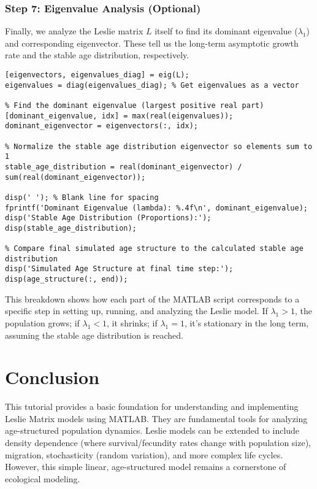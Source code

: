 \documentclass{article}
\begin{document}
\subsubsection{Step 7: Eigenvalue Analysis (Optional)}
Finally, we analyze the Leslie matrix $L$ itself to find its dominant eigenvalue ($\lambda_1$) and corresponding eigenvector. These tell us the long-term asymptotic growth rate and the stable age distribution, respectively.
\begin{lstlisting}[caption={Eigenvalue analysis of the Leslie Matrix}]
[eigenvectors, eigenvalues_diag] = eig(L);
eigenvalues = diag(eigenvalues_diag); % Get eigenvalues as a vector

% Find the dominant eigenvalue (largest positive real part)
[dominant_eigenvalue, idx] = max(real(eigenvalues));
dominant_eigenvector = eigenvectors(:, idx);

% Normalize the stable age distribution eigenvector so elements sum to 1
stable_age_distribution = real(dominant_eigenvector) / sum(real(dominant_eigenvector));

disp(' '); % Blank line for spacing
fprintf('Dominant Eigenvalue (lambda): %.4f\n', dominant_eigenvalue);
disp('Stable Age Distribution (Proportions):');
disp(stable_age_distribution);

% Compare final simulated age structure to the calculated stable age distribution
disp('Simulated Age Structure at final time step:');
disp(age_structure(:, end));
\end{lstlisting}

This breakdown shows how each part of the MATLAB script corresponds to a specific step in setting up, running, and analyzing the Leslie model. If $\lambda_1 > 1$, the population grows; if $\lambda_1 < 1$, it shrinks; if $\lambda_1 = 1$, it's stationary in the long term, assuming the stable age distribution is reached.

\section{Conclusion}

This tutorial provides a basic foundation for understanding and implementing Leslie Matrix models using MATLAB. They are fundamental tools for analyzing age-structured population dynamics. Leslie models can be extended to include density dependence (where survival/fecundity rates change with population size), migration, stochasticity (random variation), and more complex life cycles. However, this simple linear, age-structured model remains a cornerstone of ecological modeling.
\end{document}
